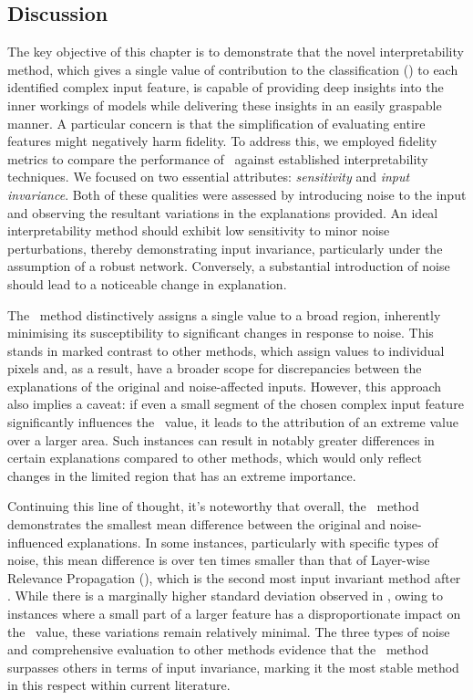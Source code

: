 \newpage

\subsection{Discussion}

The key objective of this chapter is to demonstrate that the novel interpretability method, which gives a single value of contribution to the classification (\CTC) to each identified complex input feature, is capable of providing deep insights into the inner workings of models while delivering these insights in an easily graspable manner. A particular concern is that the simplification of evaluating entire features might negatively harm fidelity. To address this, we employed fidelity metrics to compare the performance of \CTC\ against established interpretability techniques. We focused on two essential attributes: \emph{sensitivity} and \emph{input invariance}. Both of these qualities were assessed by introducing noise to the input and observing the resultant variations in the explanations provided. An ideal interpretability method should exhibit low sensitivity to minor noise perturbations, thereby demonstrating input invariance, particularly under the assumption of a robust network. Conversely, a substantial introduction of noise should lead to a noticeable change in explanation. 

The \CTC\ method distinctively assigns a single value to a broad region, inherently minimising its susceptibility to significant changes in response to noise. This stands in marked contrast to other methods, which assign values to individual pixels and, as a result, have a broader scope for discrepancies between the explanations of the original and noise-affected inputs. However, this approach also implies a caveat: if even a small segment of the chosen complex input feature significantly influences the \CTC\ value, it leads to the attribution of an extreme value over a larger area. Such instances can result in notably greater differences in certain explanations compared to other methods, which would only reflect changes in the limited region that has an extreme importance.

Continuing this line of thought, it's noteworthy that overall, the \CTC\ method demonstrates the smallest mean difference between the original and noise-influenced explanations. In some instances, particularly with specific types of noise, this mean difference is over ten times smaller than that of Layer-wise Relevance Propagation (\LRP), which is the second most input invariant method after \CTC. While there is a marginally higher standard deviation observed in \CTC, owing to instances where a small part of a larger feature has a disproportionate impact on the \CTC\ value, these variations remain relatively minimal. The three types of noise and comprehensive evaluation to other methods evidence that the \CTC\ method surpasses others in terms of input invariance, marking it the most stable method in this respect within current literature. 

